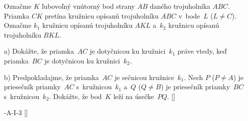 {%
Označme $K$ ľubovoľný vnútorný bod strany $AB$ daného
  trojuholníka $ABC$. Priamka $CK$ pretína kružnicu opísanú trojuholníku
  $ABC$ v~bode~$L$ ($L\ne C$). Označme $k_1$ kružnicu opísanú
  trojuholníku $AK\!L$ a~$k_2$ kružnicu opísanú trojuholníku $BK\!L$.
\item{a)} Dokážte, že priamka~$AC$ je dotyčnicou ku kružnici~$k_1$ práve
vtedy, keď priamka~$BC$ je dotyčnicou ku kružnici~$k_2$.
\item{b)} Predpokladajme, že priamka~$AC$ je sečnicou kružnice~$k_1$.
Nech $P$ ($P\ne A$) je priesečník priamky~$AC$ s~kružnicou~$k_1$
a~$Q$ ($Q\ne B$) je priesečník priamky~$BC$ s~kružnicou~$k_2$. Dokážte, že
bod~$K$ leží na úsečke~$PQ$.
[]

-A-I-3
[]
}

